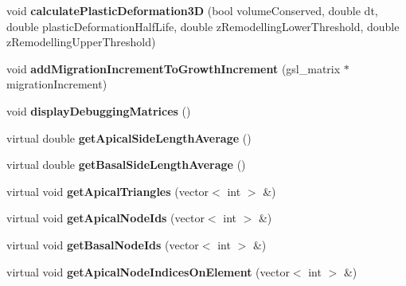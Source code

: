 \begin{DoxyCompactItemize}
\item 
\hypertarget{classShapeBase_aa1c9eda4ef1eb0b23620235039bab921}{}void {\bfseries calculate\+Plastic\+Deformation3\+D} (bool volume\+Conserved, double dt, double plastic\+Deformation\+Half\+Life, double z\+Remodelling\+Lower\+Threshold, double z\+Remodelling\+Upper\+Threshold)\label{classShapeBase_aa1c9eda4ef1eb0b23620235039bab921}

\item 
\hypertarget{classShapeBase_a4209349f115394a765fd969f5166bb4b}{}void {\bfseries add\+Migration\+Increment\+To\+Growth\+Increment} (gsl\+\_\+matrix $\ast$migration\+Increment)\label{classShapeBase_a4209349f115394a765fd969f5166bb4b}

\item 
\hypertarget{classShapeBase_ac9a9f16148650a7acce1ec74aa693930}{}void {\bfseries display\+Debugging\+Matrices} ()\label{classShapeBase_ac9a9f16148650a7acce1ec74aa693930}

\item 
\hypertarget{classShapeBase_a6d8088a8bb897d79a796a253c06d954f}{}virtual double {\bfseries get\+Apical\+Side\+Length\+Average} ()\label{classShapeBase_a6d8088a8bb897d79a796a253c06d954f}

\item 
\hypertarget{classShapeBase_a050c5dc5cd30c29e79533a367723b936}{}virtual double {\bfseries get\+Basal\+Side\+Length\+Average} ()\label{classShapeBase_a050c5dc5cd30c29e79533a367723b936}

\item 
\hypertarget{classShapeBase_a15fc4de860f3ed4ae05310b655f21836}{}virtual void {\bfseries get\+Apical\+Triangles} (vector$<$ int $>$ \&)\label{classShapeBase_a15fc4de860f3ed4ae05310b655f21836}

\item 
\hypertarget{classShapeBase_a161a3c9f10785b04f830c7f96e7d1d6f}{}virtual void {\bfseries get\+Apical\+Node\+Ids} (vector$<$ int $>$ \&)\label{classShapeBase_a161a3c9f10785b04f830c7f96e7d1d6f}

\item 
\hypertarget{classShapeBase_a72532efab3de3fced996c4514881025c}{}virtual void {\bfseries get\+Basal\+Node\+Ids} (vector$<$ int $>$ \&)\label{classShapeBase_a72532efab3de3fced996c4514881025c}

\item 
\hypertarget{classShapeBase_a84d9740a94b185e9ce26e5f4541b2b14}{}virtual void {\bfseries get\+Apical\+Node\+Indices\+On\+Element} (vector$<$ int $>$ \&)\label{classShapeBase_a84d9740a94b185e9ce26e5f4541b2b14}


\end{DoxyCompactItemize}
